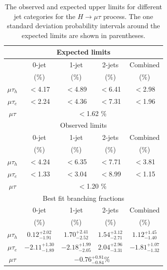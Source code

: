 \documentclass[oneside, letterpaper, oldfontcommands]{memoir}
\begin{document}
\begin{table}[hbtp]
 \centering
  \caption{The observed and expected upper limits for different
    jet categories for the $H \rightarrow \mu \tau$  process.
    The one standard deviation probability intervals around the expected limits are shown in parentheses.}
 \label{tab:expected_limits13TeV}
\begin{tabular}{c|c|c|c|c} \hline
\multicolumn{5}{c}{Expected limits} \\ \hline
                       &  \multicolumn{1}{c|}{0-jet}   & \multicolumn{1}{c|}{1-jet}    &  \multicolumn{1}{c|}{2-jets} & \multicolumn{1}{c}{Combined}                 \\
                       & (\%)                     & (\%)                     & (\%)  &    (\%)                  \\   \cline{2-5}
          $\mu\tau_{h}$  & $<$4.17  & $<$4.89   & $<$6.41   &   $<$2.98   \\
      $\mu\tau_{e}$           & $<$2.24   &  $<$4.36  &  $<$7.31  &  $<$1.96    \\ \hline
            $\mu\tau$      &        \multicolumn{4}{c}{  $<$1.62  \% }                              \\ \hline \hline
\multicolumn{5}{c}{Observed limits} \\ \hline
                       &  \multicolumn{1}{c|}{0-jet}   & \multicolumn{1}{c|}{1-jet}    &  \multicolumn{1}{c|}{2-jets} & \multicolumn{1}{c}{Combined}                 \\
                       & (\%)                     & (\%)                     & (\%)  &    (\%)                  \\   \cline{2-5}
          $\mu\tau_{h}$  & $<$4.24  & $<$6.35   & $<$7.71   &   $<$3.81   \\
      $\mu\tau_{e}$           & $<$1.33   &  $<$3.04  &  $<$8.99  &  $<$1.15    \\ \hline
            $\mu\tau$      &        \multicolumn{4}{c}{  $<$1.20  \% }                              \\ \hline \hline
\multicolumn{5}{c}{Best fit branching fractions} \\ \hline
                       &  \multicolumn{1}{c|}{0-jet}   & \multicolumn{1}{c|}{1-jet}    &  \multicolumn{1}{c|}{2-jets} & \multicolumn{1}{c}{Combined}                 \\
                       & (\%)                     & (\%)                     & (\%)  &    (\%)                  \\   \cline{2-5}
      \rule[-5pt]{0pt}{17pt}
      $\mu\tau_{h}$  &  $0.12^{+2.02}_{-1.91}$  &  $1.70^{+2.41}_{-2.52}$  &  $1.54^{+3.12}_{-2.71}$  &   $1.12^{+1.45}_{-1.40}$   \\
      \rule[-5pt]{0pt}{17pt}
      $\mu\tau_{e}$    &  $-2.11^{+1.30}_{-1.89}$  &  $-2.18^{+1.99}_{-2.05}$  &  $2.04^{+2.96}_{-3.31}$ & $-1.81_{-1.32}^{+1.07}$  \\ \hline
      \rule[-5pt]{0pt}{17pt}
      $\mu\tau$  & \multicolumn{4}{c}{ $-0.76^{+0.81}_{-0.84}$\% }   \\ \hline
  \end{tabular}
\end{table}
\end{document}
